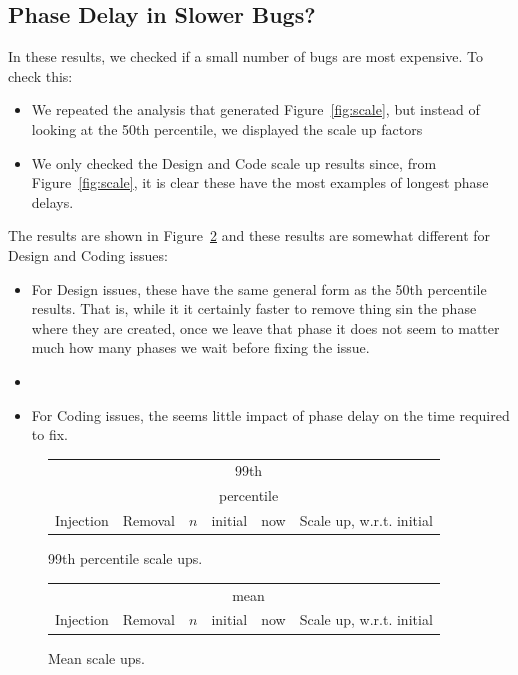 \documentclass{sig-alternate}
\newcommand{\bi}{\begin{itemize}[leftmargin=0.4cm]}
\newcommand{\ei}{\end{itemize}}
\newcommand{\fig}[1]{Figure~\ref{fig:#1}}
\def\baselinestretch{1}
\begin{document}
\subsection{Phase Delay in Slower Bugs?}
In these results, we checked if a small number of bugs are most expensive. 
To check this:
\bi
\item
We repeated the analysis that generated \fig{scale},
but instead of looking at the 50th percentile, we displayed the scale up factors
\item 
We only
checked the Design and Code scale up results since, from \fig{scale}, it is clear these
have the most examples of longest phase delays.
\ei 
The  results are shown in \fig{scale90} and these
results are somewhat different for Design and Coding issues: 
\bi 
\item For Design issues,  these have the same
general form as the 50th percentile results. That is, while it it certainly faster
to remove thing sin the phase where they are created, once we leave that phase
it does not seem to matter much how many phases we wait before fixing the issue.
\item
\item For Coding issues, the seems little impact of phase delay on the time
required to fix.
\ei

 


\begin{figure}[!t]
\renewcommand{\baselinestretch}{0.7}
\scriptsize
\begin{center}
\begin{tabular}{l@{~~}|l@{~}|r@{~}|r@{~}r@{~}|r@{~}l}
          \multicolumn{2}{c}{~}                 &  &\multicolumn{2}{c|}{99th }\\
           \multicolumn{2}{c}{~}                 &  &\multicolumn{2}{c|}{percentile }\\
  Injection&   Removal& $n$ & initial & now & \multicolumn{2}{l}{Scale up, w.r.t. initial}

\end{tabular}
\end{center}
\caption{99th percentile scale ups.}
\label{fig:scale99}
\end{figure}

\begin{figure}[!t]
\renewcommand{\baselinestretch}{0.7}
\scriptsize
\begin{center}
\begin{tabular}{l@{~~}|l@{~}|r@{~}|r@{~}r@{~}|r@{~}l}
           \multicolumn{2}{c}{~}                 &  &\multicolumn{2}{c|}{mean}\\
  Injection&   Removal& $n$ & initial & now & \multicolumn{2}{l}{Scale up, w.r.t. initial}

\end{tabular}
\end{center}
\caption{Mean  scale ups.}
\label{fig:scale90}
\end{figure}
\end{document}
